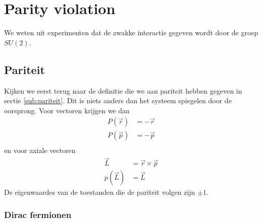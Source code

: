 \documentclass[../main.tex]{subfiles}
\begin{document}
\section{Parity violation}%
\label{sec:parity_violation}

We weten uit experimenten dat de zwakke interactie gegeven wordt door de groep $SU(2)$.

\subsection{Pariteit}%
\label{sub:pariteit_rev}

Kijken we eerst terug naar de definitie die we aan pariteit hebben gegeven in sectie \ref{sub:pariteit}. Dit is niets anders dan het systeem spiegelen door de oorsprong. Voor vectoren krijgen we dan
\begin{equation}
    \begin{aligned}
        \label{eq:pariteit_rev}
        P(\vec{r}) &= -\vec{r}\\
        P(\vec{p}) &= -\vec{p}\\
    \end{aligned}
\end{equation}
en voor axiale vectoren
\begin{equation}
    \begin{aligned}
        \label{eq:pariteit_ax}
        \vec{L} &= \vec{r} \times \vec{p}\\
        p(\vec{L}) &= \vec{L}
    \end{aligned}
\end{equation}
De eigenwaardes van de toestanden die de pariteit volgen zijn $\pm 1$.

\subsubsection{Dirac fermionen}%
\label{ssub:dirac_fermionen}
\end{document}
